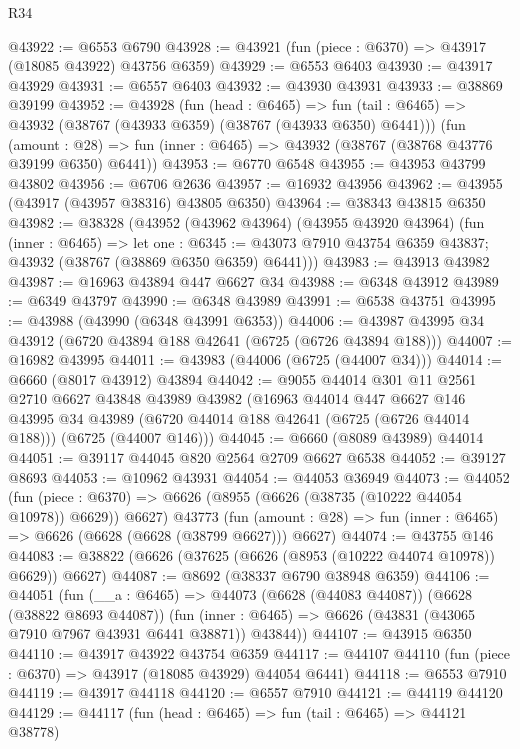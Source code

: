 \begin{lexlean}{R34}
\begin{coremodule}
@43922 := @6553 @6790
@43928 := @43921 (fun (piece : @6370) => @43917 (@18085 @43922) @43756 @6359)
@43929 := @6553 @6403
@43930 := @43917 @43929
@43931 := @6557 @6403
@43932 := @43930 @43931
@43933 := @38869 @39199
@43952 := @43928
    (fun (head : @6465) =>
    fun (tail : @6465) => @43932 (@38767 (@43933 @6359) (@38767 (@43933 @6350) @6441)))
    (fun (amount : @28) =>
    fun (inner : @6465) => @43932 (@38767 (@38768 @43776 @39199 @6350) @6441))
@43953 := @6770 @6548
@43955 := @43953 @43799 @43802
@43956 := @6706 @2636
@43957 := @16932 @43956
@43962 := @43955 (@43917 (@43957 @38316) @43805 @6350)
@43964 := @38343 @43815 @6350
@43982 := @38328
    (@43952
      (@43962 @43964)
      (@43955 @43920 @43964)
      (fun (inner : @6465) =>
      let one : @6345 := @43073 @7910 @43754 @6359 @43837;
      @43932 (@38767 (@38869 @6350 @6359) @6441)))
@43983 := @43913 @43982
@43987 := @16963 @43894 @447 @6627 @34
@43988 := @6348 @43912
@43989 := @6349 @43797
@43990 := @6348 @43989
@43991 := @6538 @43751
@43995 := @43988 (@43990 (@6348 @43991 @6353))
@44006 := @43987 @43995 @34 @43912 (@6720 @43894 @188 @42641 (@6725 (@6726 @43894 @188)))
@44007 := @16982 @43995
@44011 := @43983 (@44006 (@6725 (@44007 @34)))
@44014 := @6660 (@8017 @43912) @43894
@44042 := @9055
    @44014
    @301
    @11
    @2561
    @2710
    @6627
    @43848
    @43989
    @43982
    (@16963
      @44014
      @447
      @6627
      @146
      @43995
      @34
      @43989
      (@6720 @44014 @188 @42641 (@6725 (@6726 @44014 @188)))
      (@6725 (@44007 @146)))
@44045 := @6660 (@8089 @43989) @44014
@44051 := @39117 @44045 @820 @2564 @2709 @6627 @6538
@44052 := @39127 @8693
@44053 := @10962 @43931
@44054 := @44053 @36949
@44073 := @44052
    (fun (piece : @6370) => @6626 (@8955 (@6626 (@38735 (@10222 @44054 @10978)) @6629)) @6627)
    @43773
    (fun (amount : @28) => fun (inner : @6465) => @6626 (@6628 (@6628 (@38799 @6627))) @6627)
@44074 := @43755 @146
@44083 := @38822 (@6626 (@37625 (@6626 (@8953 (@10222 @44074 @10978)) @6629)) @6627)
@44087 := @8692 (@38337 @6790 @38948 @6359)
@44106 := @44051
    (fun (__a : @6465) =>
    @44073
      (@6628 (@44083 @44087))
      (@6628 (@38822 @8693 @44087))
      (fun (inner : @6465) => @6626 (@43831 (@43065 @7910 @7967 @43931 @6441 @38871)) @43844))
@44107 := @43915 @6350
@44110 := @43917 @43922 @43754 @6359
@44117 := @44107 @44110 (fun (piece : @6370) => @43917 (@18085 @43929) @44054 @6441)
@44118 := @6553 @7910
@44119 := @43917 @44118
@44120 := @6557 @7910
@44121 := @44119 @44120
@44129 := @44117
    (fun (head : @6465) => fun (tail : @6465) => @44121 @38778)

\end{coremodule}
\end{lexlean}

